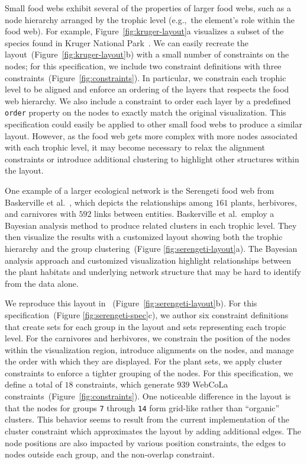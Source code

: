Small food webs exhibit several of the properties of larger food webs, such
as a node hierarchy arranged by the trophic level (e.g.,~the element's 
role within the food web).
For example, Figure~\ref{fig:kruger-layout}a visualizes a subset of the
species found in Kruger National Park~\cite{kruger2017}. We can easily 
recreate the layout~(Figure~\ref{fig:kruger-layout}b) with a small 
number of constraints on the nodes; for this specification, we include 
two constraint definitions with three constraints~(Figure~\ref{fig:constraints}).
In particular, we constrain each trophic level to be aligned and enforce an
ordering of the layers that respects the food web hierarchy. We also
include a constraint to order each layer by a predefined \texttt{order} property
on the nodes to exactly match the original visualization. This \projectname specification 
could easily be applied to other small food webs to produce a similar layout.
However, as the food web gets more complex with more nodes associated with
each trophic level, it may become necessary to relax the alignment
constraints or introduce additional clustering to highlight other
structures within the layout.

One example of a larger ecological network is the Serengeti food web from
Baskerville et al.~\cite{baskerville2011spatial}, which depicts the
relationships among $161$ plants, herbivores, and carnivores with $592$ links
between entities. Baskerville et al.\ employ a Bayesian analysis method to
produce related clusters in each trophic level. They then visualize the results with a
customized layout showing both the trophic hierarchy and
the group clustering~(Figure \ref{fig:serengeti-layout}a). The Bayesian
analysis approach and customized visualization highlight relationships between
the plant habitats and underlying network structure that may be hard to identify
from the data alone.

We reproduce this layout in \projectname~(Figure~\ref{fig:serengeti-layout}b).
For this specification~(Figure \ref{fig:serengeti-spec}c), we author six constraint 
definitions that create sets for each group in the layout and sets 
representing each tropic level. For the carnivores and herbivores,
we constrain the position of the nodes within the visualization region,
introduce alignments on the nodes, and manage the order with which they
are displayed. For the plant sets, we apply cluster constraints
to enforce a tighter grouping of the nodes. For this specification,
we define a total of $18$ \projectname constraints, which generate $939$
WebCoLa constraints~(Figure~\ref{fig:constraints}). One noticeable difference
in the \projectname layout is that the nodes for groups \texttt{7} through
\texttt{14} form grid-like rather than ``organic'' clusters. This behavior
seems to result from the current implementation of the cluster constraint
which approximates the layout by adding additional edges. The node
positions are also impacted by various position constraints, the edges to 
nodes outside each group, and the non-overlap constraint.

